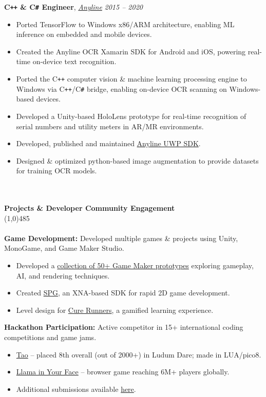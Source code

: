 \documentclass[9pt]{extarticle}
\newcommand\negativespace[1][-0.12cm]{\hspace*{#1}}
\begin{document}
{\bf C\texttt{++} \& C\texttt{\#} Engineer}, \textit{\href{https://anyline.com}{Anyline}} \hfill \textit{2015 -- 2020}
\begin{itemize}
	\setlength\itemsep{0.05em}
	\item Ported TensorFlow to Windows x86/ARM architecture, enabling ML inference on embedded and mobile devices.
	\item Created the Anyline OCR Xamarin SDK for Android and iOS, powering real-time on-device text recognition.
	\item Ported the C\texttt{++} computer vision \& machine learning processing engine to Windows via C\texttt{++}/C\texttt{\#} bridge, enabling on-device OCR scanning on Windows-based devices.
	\item Developed a Unity-based HoloLens prototype for real-time recognition of serial numbers and utility meters in AR/MR environments.
	\item Developed, published and maintained \href{https://github.com/Anyline/anyline-ocr-examples-windows-uwp}{Anyline UWP SDK}.
	\item Designed \& optimized python-based image augmentation to provide datasets for training OCR models.
\end{itemize}
	
\noindent %
\\
\\
\vspace*{-6pt}
{\negativespace \Large \bf Projects \& Developer Community Engagement}\\
\line(1,0){485}
\\
\\
\textbf{Game Development:} Developed multiple games \& projects using Unity, MonoGame, and Game Maker Studio.
\begin{itemize}
	\setlength\itemsep{0.05em}
	\item Developed a \href{https://github.com/leorean/GMStudio}{collection of 50+ Game Maker prototypes} exploring gameplay, AI, and rendering techniques.
	\item Created \href{https://github.com/leorean/SPG}{SPG}, an XNA-based SDK for rapid 2D game development.
	\item Level design for \href{https://ovos.at/de/projekte/cure-runners-ein-spiel-uber-geld-ohne-geld/}{Cure Runners}, a gamified learning experience.
\end{itemize}

\textbf{Hackathon Participation:} Active competitor in 15+ international coding competitions and game jams.
\begin{itemize}
	\setlength\itemsep{0.05em}
	\item \href{https://ldjam.com/events/ludum-dare/55/tao}{Tao} – placed 8th overall (out of 2000+) in Ludum Dare; made in LUA/pico8.
	\item \href{https://www.newgrounds.com/portal/view/599044}{Llama in Your Face} – browser game reaching 6M+ players globally.
	\item Additional submissions available \href{https://ldjam.com/users/leorean/games}{here}.
\end{itemize}
	
\end{document}
